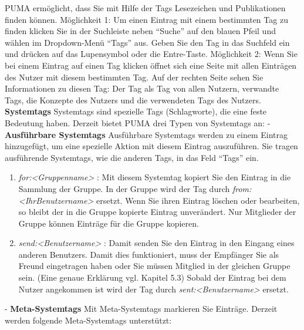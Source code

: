 \documentclass[a4paper,11pt,twoside]{scrbook}
\begin{document}
PUMA ermöglicht, dass Sie mit Hilfe der Tags Lesezeichen und Publikationen finden können. \newline
Möglichkeit 1: Um einen Eintrag mit einem bestimmten Tag zu finden klicken Sie in der Suchleiste neben \enquote{Suche} auf den blauen Pfeil und wählen im Dropdown-Menü \enquote{Tags} aus. Geben Sie den Tag in das Suchfeld ein und drücken auf das Lupensymbol oder die Entre-Taste.\newline
Möglichkeit 2: Wenn Sie bei einem Eintrag auf einen Tag klicken öffnet sich eine Seite mit allen Einträgen des Nutzer mit diesem bestimmten Tag. Auf der rechten Seite sehen Sie Informationen zu diesen Tag: Der Tag als Tag von allen Nutzern, verwandte Tags, die Konzepte des Nutzers und die verwendeten Tags des Nutzers. 
\newline
\newline
\textbf{Systemtags}
\newline
Systemtags sind spezielle Tags (Schlagworte), die eine feste Bedeutung haben. Derzeit bietet PUMA drei Typen von Systemtags an: \newline\newline
- \textbf{Ausführbare Systemtags}\newline
Ausführbare Systemtags werden zu einem Eintrag hinzugefügt, um eine spezielle Aktion mit diesem Eintrag auszuführen. Sie tragen ausführende Systemtags, wie die anderen Tags, in das Feld \enquote{Tags} ein. 
\begin{enumerate}
    \item \textit{for:<Gruppenname>} : Mit diesem Systemtag kopiert Sie den Eintrag in die Sammlung der Gruppe. In der Gruppe wird der Tag durch \textit{from:<IhrBenutzername>} ersetzt. Wenn Sie ihren Eintrag löschen oder bearbeiten, so bleibt der in die Gruppe kopierte Eintrag unverändert. Nur Mitglieder der Gruppe können Einträge für die Gruppe kopieren.
    \item \textit{send:<Benutzername>} : Damit senden Sie den Eintrag in den Eingang eines anderen Benutzers. Damit dies funktioniert, muss der Empfänger Sie als Freund eingetragen haben oder Sie müssen Mitglied in der gleichen Gruppe sein. (Eine genaue Erklärung vgl. Kapitel 5.3) Sobald der Eintrag bei dem Nutzer angekommen ist wird der Tag durch \textit{sent:<Benutzername>} ersetzt.
\end{enumerate}
- \textbf{Meta-Systemtags}
\newline   
Mit Meta-Systemtags markieren Sie Einträge. Derzeit werden folgende Meta-Systemtags unterstützt:
\end{document}

